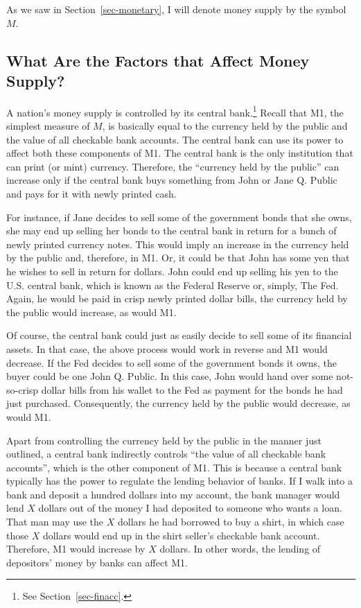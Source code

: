 \documentclass[
  letterpaper,
]{book}
\theoremstyle{plain}
\theoremstyle{remark}
\begin{document}
As we saw in Section~\ref{sec-monetary}, I will denote money supply by
the symbol \(M\).

\subsection{What Are the Factors that Affect Money
Supply?}\label{sec-msupplydet}

A nation's money supply is controlled by its central bank.\footnote{See
  Section~\ref{sec-finacc}.}
 Recall that M1, the
simplest measure of \(M\), is basically equal to the currency held by
the public and the value of all checkable bank accounts. The central
bank can use its power to affect both these components of M1. The
central bank is the only institution that can print (or mint) currency.
Therefore, the ``currency held by the public'' can increase only if the
central bank buys something from John or Jane Q. Public and pays for it
with newly printed cash.

For instance, if Jane decides to sell some of the government bonds that
she owns, she may end up selling her bonds to the central bank in return
for a bunch of newly printed currency notes. This would imply an
increase in the currency held by the public and, therefore, in M1. Or,
it could be that John has some yen that he wishes to sell in return for
dollars. John could end up selling his yen to the U.S. central bank,
which is known as the Federal Reserve or, simply, The Fed. Again, he
would be paid in crisp newly printed dollar bills, the currency held by
the public would increase, as would M1.

Of course, the central bank could just as easily decide to sell some of
its financial assets. In that case, the above process would work in
reverse and M1 would decrease. If the Fed decides to sell some of the
government bonds it owns, the buyer could be one John Q. Public. In this
case, John would hand over some not-so-crisp dollar bills from his
wallet to the Fed as payment for the bonds he had just purchased.
Consequently, the currency held by the public would decrease, as would
M1.

Apart from controlling the currency held by the public in the manner
just outlined, a central bank indirectly controls ``the value of all
checkable bank accounts'', which is the other component of M1. This is
because a central bank typically has the power to regulate the lending
behavior of banks. If I walk into a bank and deposit a hundred dollars
into my account, the bank manager would lend \(X\) dollars out of the
money I had deposited to someone who wants a loan. That man may use the
\(X\) dollars he had borrowed to buy a shirt, in which case those \(X\)
dollars would end up in the shirt seller's checkable bank account.
Therefore, M1 would increase by \(X\) dollars. In other words, the
lending of depositors' money by banks can affect M1.
\end{document}
